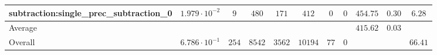 \begin{tabular}{|l|c|c|c|c|c|c|c|c|c|c|}
subtraction:single\_prec\_subtraction\_0         & $ 1.979 \cdot 10^{-2} $ & $ 9      $ & $ 480  $ & $ 171  $ & $ 412   $ & $ 0  $ & $ 0 $ & $ 454.75      $ & $ 0.30    $ & $ 6.28    $ \\
\hline
Average                                          & $                     $ & $        $ & $      $ & $      $ & $       $ & $    $ & $   $ & $ 415.62      $ & $ 0.03    $ & $         $ \\
\hline
Overall                                          & $ 6.786 \cdot 10^{-1} $ & $ 254    $ & $ 8542 $ & $ 3562 $ & $ 10194 $ & $ 77 $ & $ 0 $ & $             $ & $         $ & $ 66.41   $ \\
\hline
\end{tabular}

